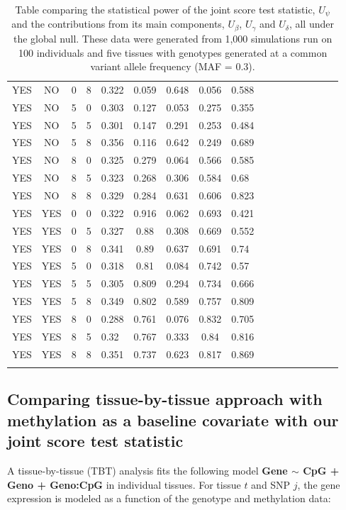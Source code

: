 \documentclass[hidelinks]{article}
\begin{document}
\begin{longtable}{lclclclclclclclc|c|}
YES & NO & 0 & 8 & 0.322 & 0.059 & 0.648 & 0.056 & 0.588 \\
YES & NO & 5 & 0 & 0.303 & 0.127 & 0.053 & 0.275 & 0.355 \\
YES & NO & 5 & 5 & 0.301 & 0.147 & 0.291 & 0.253 & 0.484 \\
YES & NO & 5 & 8 & 0.356 & 0.116 & 0.642 & 0.249 & 0.689 \\
YES & NO & 8 & 0 & 0.325 & 0.279 & 0.064 & 0.566 & 0.585 \\
YES & NO & 8 & 5 & 0.323 & 0.268 & 0.306 & 0.584 & 0.68 \\
YES & NO & 8 & 8 & 0.329 & 0.284 & 0.631 & 0.606 & 0.823 \\	\hdashline
YES & YES & 0 & 0 & 0.322 & 0.916 & 0.062 & 0.693 & 0.421 \\
YES & YES & 0 & 5 & 0.327 & 0.88 & 0.308 & 0.669 & 0.552 \\
YES & YES & 0 & 8 & 0.341 & 0.89 & 0.637 & 0.691 & 0.74 \\
YES & YES & 5 & 0 & 0.318 & 0.81 & 0.084 & 0.742 & 0.57 \\
YES & YES & 5 & 5 & 0.305 & 0.809 & 0.294 & 0.734 & 0.666 \\
YES & YES & 5 & 8 & 0.349 & 0.802 & 0.589 & 0.757 & 0.809 \\
YES & YES & 8 & 0 & 0.288 & 0.761 & 0.076 & 0.832 & 0.705 \\
YES & YES & 8 & 5 & 0.32 & 0.767 & 0.333 & 0.84 & 0.816 \\
YES & YES & 8 & 8 & 0.351 & 0.737 & 0.623 & 0.817 & 0.869 \\
\hline \hline
\caption{Table comparing the statistical power of the joint score test statistic, $U_\psi$ and the contributions from its main components, $U_\beta$, $U_\gamma$ and $U_\delta$, all under the global null. These data were generated from 1,000 simulations run on 100 individuals and five tissues with genotypes generated at a common variant allele frequency (MAF = 0.3). }
\end{longtable}

\subsection{Comparing tissue-by-tissue approach with methylation as a baseline covariate with our joint score test statistic}

A tissue-by-tissue (TBT) analysis fits the following model \textbf{Gene $\sim$ CpG + Geno + Geno:CpG} in individual tissues. For tissue $t$ and SNP $j$, the gene expression is modeled as a function of the genotype and methylation data:
\end{document}
